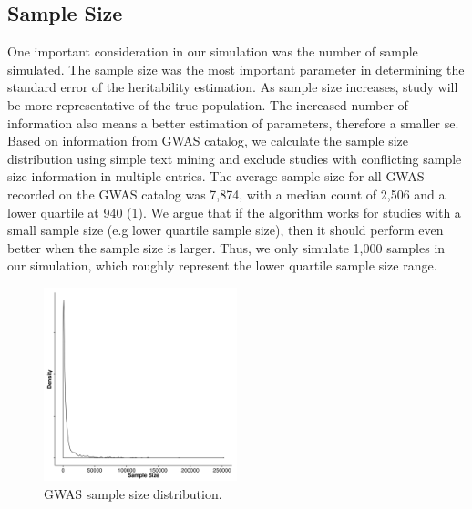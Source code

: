 		\subsection{Sample Size}
			One important consideration in our simulation was the number of sample simulated. 
			The sample size was the most important parameter in determining the standard error of the heritability estimation. 
			As sample size increases, study will be more representative of the true population. 
			The increased number of information also means a better estimation of parameters, therefore a smaller \acrfull{se}.
			Based on information from \gls{GWAS} catalog\citep{Welter2014}, we calculate the sample size distribution using simple text mining and exclude studies with conflicting sample size information in multiple entries. 
			The average sample size for all \gls{GWAS} recorded on the \gls{GWAS} catalog was 7,874, with a median count of 2,506 and a lower quartile at 940 (\cref{fig:gwasCata}). 
			We argue that if the algorithm works for studies with a small sample size (e.g lower quartile sample size), then it should perform even better when the sample size is larger. 
			Thus, we only simulate 1,000 samples in our simulation, which roughly represent the lower quartile sample size range.
				
			\begin{figure}
				\centering
				\includegraphics[width=0.5\textwidth]{figure/gwasSampleSize.png}
				\caption[GWAS Sample Size distribution]{
					\gls{GWAS} sample size distribution.
				}
				\label{fig:gwasCata}
			\end{figure}
